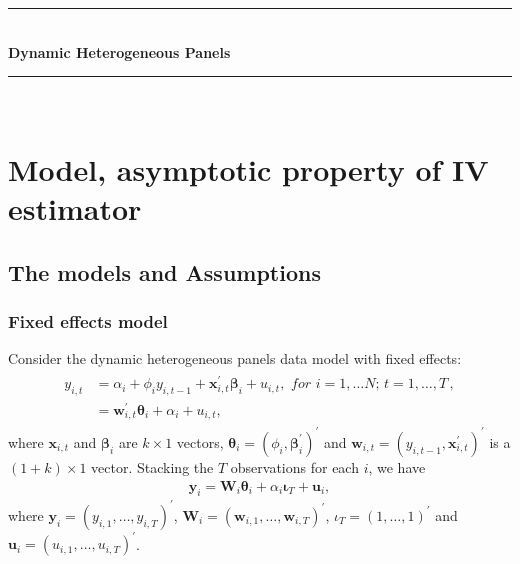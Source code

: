 \documentclass[12pt,a4paper,hyperref]{article}
\begin{document}
\begin{titlepage}

\newcommand{\HRule}{\rule{\linewidth}{0.5mm}} %

\center %



\HRule \\[0.4cm]
{ \huge \bfseries Dynamic Heterogeneous Panels }\\[0.4cm] %
\HRule \\[1.5cm]


\vfill %

\end{titlepage}

\newpage
\tableofcontents
\newpage
\section{Model, asymptotic property of IV estimator}
\subsection{The models and Assumptions}
\subsubsection{Fixed effects model}
Consider the dynamic heterogeneous panels data model with fixed effects:
\begin{align}
\begin{split}
y_{i,t}&=\alpha_{i}+\phi_{i} y_{i,t-1}+ \boldsymbol{x}^{'}_{i,t}\boldsymbol{\beta}_{i}+u_{i,t}, \,\, for\,\,i=1,\ldots N;\,t=1,\ldots,T\, , \\
&= \boldsymbol{w}^{'}_{i,t}\boldsymbol{\theta}_{i}+ \alpha_{i}+u_{i,t}, \label{1}
\end{split}
\end{align}
where $\boldsymbol{x}_{i,t}$ and $\boldsymbol{\beta}_{i}$ are $k \times 1$ vectors, $\boldsymbol{\theta}_{i}=\left(\phi_{i}, \boldsymbol{\beta}^{'}_{i} \right)^{'}$ and $\boldsymbol{w}_{i,t}=\left(y_{i,t-1}, \boldsymbol{x}^{'}_{i,t} \right)^{'}$ is a $\left(1+k\right) \times 1$ vector.
Stacking the $T$ observations for each $i$, we have
\begin{align}
\boldsymbol{y}_{i}=\boldsymbol{W}_{i}\boldsymbol{\theta}_{i}+ \alpha_{i}\boldsymbol{\iota}_{T}+ \boldsymbol{u}_{i}, \label{2}
\end{align}
where $\boldsymbol{y}_{i}=\left(y_{i,1},\ldots, y_{i,T} \right)^{'}$, $\boldsymbol{W}_{i}=\left(\boldsymbol{w}_{i,1},\ldots, \boldsymbol{w}_{i,T} \right)^{'}$, $\iota_{T}=\left(1,\ldots,1 \right)^{'}$ and $\boldsymbol{u}_{i}=\left(u_{i,1}, \ldots, u_{i,T} \right)^{'}$. 
\end{document}
